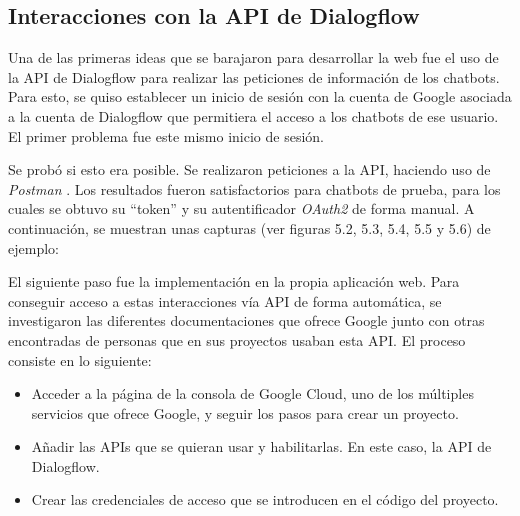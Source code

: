 \subsection{Interacciones con la API de Dialogflow}
Una de las primeras ideas que se barajaron para desarrollar la web fue el uso de la API de Dialogflow para realizar las peticiones de información de los chatbots. Para esto, se quiso establecer un inicio de sesión con la cuenta de Google asociada a la cuenta de Dialogflow que permitiera el acceso a los chatbots de ese usuario. El primer problema fue este mismo inicio de sesión. 

Se probó si esto era posible. Se realizaron peticiones a la API, haciendo uso de \textit{Postman} \cite{PostmanA62:online}. Los resultados fueron satisfactorios para chatbots de prueba, para los cuales se obtuvo su ``token'' y su autentificador \textit{OAuth2} de forma manual. A continuación, se muestran unas capturas (ver figuras 5.2, 5.3, 5.4, 5.5 y 5.6) de ejemplo:

El siguiente paso fue la implementación en la propia aplicación web. Para conseguir acceso a estas interacciones vía API de forma automática, se investigaron las diferentes documentaciones que ofrece Google junto con otras encontradas de personas que en sus proyectos usaban esta API. El proceso consiste en lo siguiente:
\begin{itemize}
    \item Acceder a la página de la consola de Google Cloud, uno de los múltiples servicios que ofrece Google, y seguir los pasos para crear un proyecto.
    \item Añadir las APIs que se quieran usar y habilitarlas. En este caso, la API de Dialogflow.
    \item Crear las credenciales de acceso que se introducen en el código del proyecto.
\end{itemize} 

